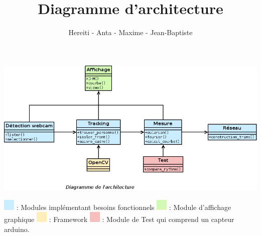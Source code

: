 \documentclass[12pt,a4paper]{article}
\title{Diagramme d'architecture}
\author{Hereiti \bsc{Hatitio} - Anta \bsc{Mbaye} - Maxime \bsc{Vincent} - Jean-Baptiste \bsc{Rey}}
\begin{document}
\maketitle

\newpage
\vspace*{-1in}
\vspace*{-\the\hoffset}
\includegraphics[scale=0.75,angle=90]{archi.jpeg}
\begin{center}

\end{center}
\includegraphics[scale=0.5]{bleu.png} : Modules implémentant besoins fonctionnels\newline
\includegraphics[scale=0.5]{vert.png} : Module d'affichage graphique\newline
\includegraphics[scale=0.5]{orange.png} : Framework\newline
\includegraphics[scale=0.5]{rouge.png} : Module de Test qui comprend un capteur arduino.\newline
\end{document}
